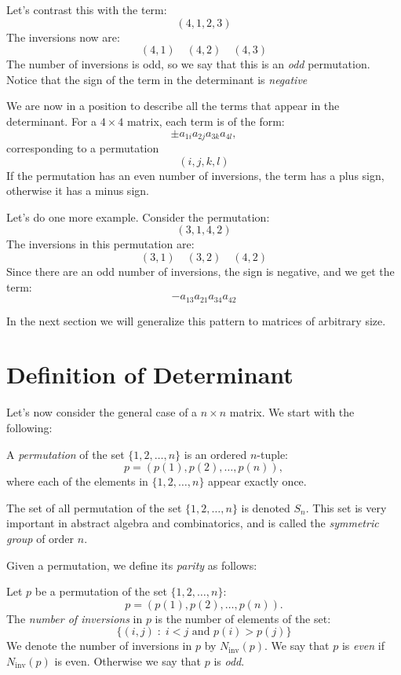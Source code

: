 \documentclass[12pt]{article}
\begin{document}
Let's contrast this with the term:
\[
(4,1,2,3)
\]
The inversions now are:
\[
(4,1)\quad(4,2)\quad(4,3)
\]
The number of inversions is odd, so we say that this is an \emph{odd} permutation. Notice that the sign of the term in the determinant is \emph{negative}

We are now in a position to describe all the terms that appear in the determinant. For a $4\times 4$ matrix, each term is of the form:
\[
\pm a_{1i}a_{2j}a_{3k}a_{4l},
\]
corresponding to a permutation
\[
(i,j,k,l)
\]
If the permutation has an even number of inversions, the term has a plus sign, otherwise it has a minus sign.

Let's do one more example. Consider the permutation:
\[
(3,1,4,2)
\]
The inversions in this permutation are:
\[
(3,1)\quad(3,2)\quad(4,2)
\]
Since there are an odd number of inversions, the sign is negative, and we get the term:
\[
-a_{13}a_{21}a_{34}a_{42}
\]

In the next section we will generalize this pattern to matrices of arbitrary size.

\section{Definition of Determinant}

Let's now consider the general case of a $n\times n$ matrix. We start with the following:

\begin{definition} A \emph{permutation} of the set $\{1,2,\ldots,n\}$ is an ordered $n$-tuple:
\[
p = (p(1),p(2),\ldots,p(n)),
\]
where each of the elements in $\{1,2,\dots,n\}$ appear exactly once.
\end{definition}

The set of all permutation of the set $\{1,2,\ldots,n\}$ is denoted $S_n$. This set is very important in abstract algebra and combinatorics, and is called the \emph{symmetric group} of order $n$. 

Given a permutation, we define its \emph{parity} as follows:

\begin{definition} Let $p$ be a permutation of the set $\{1,2,\ldots,n\}$:
\[
p = (p(1),p(2),\ldots,p(n)).
\]
The \emph{number of inversions} in $p$ is the number of elements of the set:
\[
\{(i,j)\;:\; i<j\text{ and } p(i)>p(j)\}
\]
We denote the number of inversions in $p$ by $N_{\text{inv}}(p)$. We say that $p$ is \emph{even} if $N_{\text{inv}}(p)$ is even. Otherwise we say that $p$ is \emph{odd}.
\end{definition}
\end{document}
